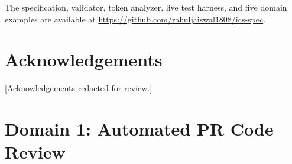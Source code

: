 \documentclass[11pt]{article}
\begin{document}
The specification, validator, token analyzer, live test harness, and five
domain examples are available at
\url{https://github.com/rahuljaiswal1808/ics-spec}.

\section*{Acknowledgements}
[Acknowledgements redacted for review.]




\appendix

\section{Domain 1: Automated PR Code Review}
\label{app:review}
\end{document}
